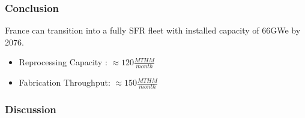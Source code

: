 \begin{frame}
	\frametitle{Conclusion}
	France can transition into
	a fully SFR fleet with installed capacity of 66GWe by 2076.
	\begin{itemize}
		\item Reprocessing Capacity : $\approx 120 \frac{MTHM}{month}$
		\item Fabrication Throughput: $\approx 150 \frac{MTHM}{month}$
	\end{itemize}
\end{frame}

\begin{frame}
    \frametitle{Discussion}
    \begin{table}[h]
\centering
    \begin{adjustbox}{max totalsize={1.1\textwidth}{.8\textheight}, center}
                \begin{tabularx}{\textwidth}{lbb}
                    \hline 
                    

\end{tabularx}
\end{adjustbox}
\end{table}
\end{frame}
